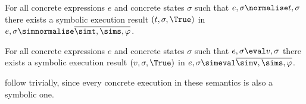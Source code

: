 \begin{lemma}
  \label{lem:completeNormalise}
  For all concrete expressions $e$ and concrete states $\sigma$ such that $e,\sigma\normalise t,\sigma$
  there exists a symbolic execution result $(t,\sigma,\True)$ in $e,\sigma\simnormalise \overline{\simt,\sims,\phi}$.

\end{lemma}

\begin{lemma}
  \label{lem:completeEval}
  For all concrete expressions $e$ and concrete states $\sigma$ such that $e,\sigma \eval v, \sigma$
  there exists a symbolic execution result $(v,\sigma,\True)$ in $e,\sigma\simeval \overline{\simv,\sims,\phi}$.

\end{lemma}

 follow trivially, since every concrete execution in these semantics is also a symbolic one.
